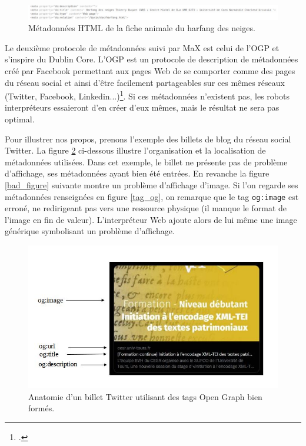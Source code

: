 \documentclass[a4paper,12pt,twoside]{book}
\begin{document}
\begin{figure}[H]
    \centering
    \includegraphics[width=\textwidth,height=\textheight,keepaspectratio]{img/partie_2/metadata_dc_animal.JPG}
    \caption{Métadonnées \acrshort{HTML} de la fiche animale du harfang des neiges.}
    \label{dc_animal}
\end{figure}


Le deuxième protocole de métadonnées suivi par MaX est celui de l'\acrfull{OGP} et s'inspire du Dublin Core. L'\acrshort{OGP} est un protocole de description de métadonnées créé par Facebook permettant aux pages Web de se comporter comme des pages du réseau social et ainsi d'être facilement partageables sur ces mêmes réseaux (Twitter, Facebook, Linkedin...)\footcite{OGP}. Si ces métadonnées n'existent pas, les robots interpréteurs essaieront d'en créer d'eux mêmes, mais le résultat ne sera pas optimal.

Pour illustrer nos propos, prenons l'exemple des billets de blog du réseau social Twitter. La figure \ref{twitter} ci-dessous illustre l'organisation et la localisation de métadonnées utilisées. Dans cet exemple, le billet ne présente pas de problème d'affichage, ses métadonnées ayant bien été entrées. En revanche la figure \ref{bad_figure} suivante montre un problème d'affichage d'image. Si l'on regarde ses métadonnées renseignées en figure \ref{tag_og}, on remarque que le tag \texttt{og:image} est erroné, ne redirigeant pas vers une ressource physique (il manque le format de l'image en fin de valeur). L'interpréteur Web ajoute alors de lui même une image générique symbolisant un problème d'affichage.

\begin{figure}[H]
    \centering
    \includegraphics[width=12cm]{img/partie_2/exemple_og.JPG}
    \caption{Anatomie d'un billet Twitter utilisant des tags Open Graph bien formés.}
    \label{twitter}
\end{figure}
\end{document}
